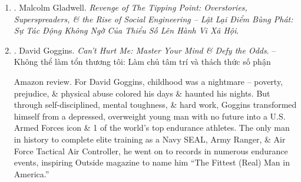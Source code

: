 \documentclass{article}
\begin{document}
\begin{enumerate}
	\item \cite{Gladwell_revenge_tipping_point_VN}. {\sc Malcolm Gladwell}. {\it Revenge of The Tipping Point: Overstories, Superspreaders, \& the Rise of Social Engineering -- Lật Lại Điểm Bùng Phát: Sự Tác Động Không Ngờ Của Thiểu Số Lên Hành Vi Xã Hội}.\hfill{\sf[done]}
	
	\item \cite{Goggins_hurt}. {\sc David Goggins}. {\it Can't Hurt Me: Master Your Mind \& Defy the Odds}. -- Không thể làm tổn thương tôi: Làm chủ tâm trí và thách thức số phận {}
	
	{\sf Amazon review.} For {\sc David Goggins}, childhood was a nightmare -- poverty, prejudice, \& physical abuse colored his days \& haunted his nights. But through self-disciplined, mental toughness, \& hard work, {\sc Goggins} transformed himself from a depressed, overweight young man with no future into a U.S. Armed Forces icon \& 1 of the world's top endurance athletes. The only man in history to complete elite training as a Navy SEAL, Army Ranger, \& Air Force Tactical Air Controller, he went on to records in numerous endurance events, inspiring Outside magazine to name him ``The Fittest (Real) Man in America.''
	

\end{enumerate}
\end{document}
